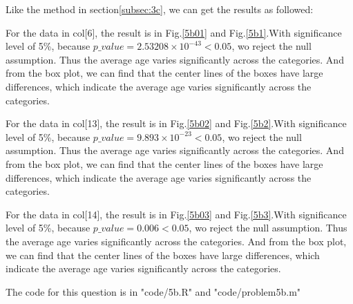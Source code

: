 \documentclass[a4paper]{article}
\begin{document}
Like the method in section\ref{subsec:3c}, we can get the results as followed:

For the data in col[6], the result is in Fig.\ref{5b01} and Fig.\ref{5b1}.With significance level of 5\%, because $p\_value=2.53208\times 10^{-43}<0.05$, wo reject the null assumption. Thus the average age varies significantly across the categories. And from the box plot, we can find that the center lines of the
boxes have large differences, which indicate the average age varies significantly across the categories.


For the data in col[13], the result is in Fig.\ref{5b02} and Fig.\ref{5b2}.With significance level of 5\%, because $p\_value=9.893\times 10^{-23}<0.05$, wo reject the null assumption. Thus the average age varies significantly across the categories. And from the box plot, we can find that the center lines of the
boxes have large differences, which indicate the average age varies significantly across the categories.

For the data in col[14], the result is in Fig.\ref{5b03} and Fig.\ref{5b3}.With significance level of 5\%, because $p\_value=0.006<0.05$, wo reject the null assumption. Thus the average age varies significantly across the categories. And from the box plot, we can find that the center lines of the
boxes have large differences, which indicate the average age varies significantly across the categories.

The code for this question is in "code/5b.R" and "code/problem5b.m"
\end{document}
